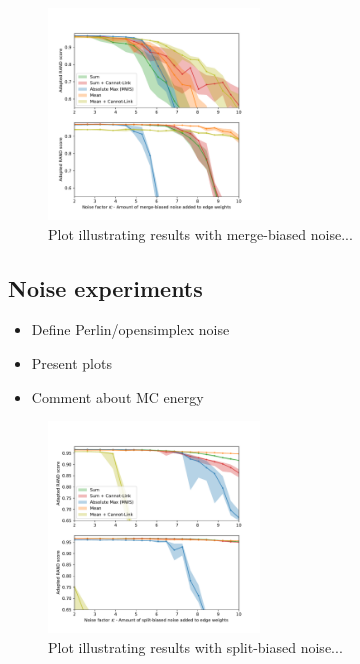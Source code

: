 \begin{figure}
\centering
\includegraphics[width=0.50\textwidth,trim=0.35in 0.35in 0.35in 0.35in,clip]{./figs/merge_noise.pdf}
\caption{Plot illustrating results with merge-biased noise...}
\end{figure}

\subsection{Noise experiments}
\begin{itemize}
\item Define Perlin/opensimplex noise
\item Present plots
\item Comment about MC energy
\end{itemize}


\begin{figure}
\centering
\includegraphics[width=0.50\textwidth,trim=0.27in 0.27in 0.27in 0.27in,clip]{./figs/split_noise.pdf}
\caption{Plot illustrating results with split-biased noise...}
\end{figure}
